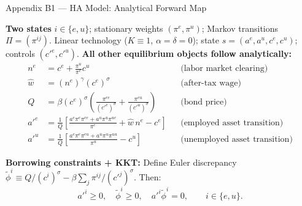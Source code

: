 \documentclass[10pt,aspectratio=169]{beamer}
\begin{document}
\begin{frame}[label=appHAmodel]{Appendix B1 --- HA Model: Analytical Forward Map}
\hfill\hyperlink{mainM2}{}
\vspace{0.2em}

\textbf{Two states} $i\in\{e,u\}$; stationary weights $(\pi^e,\pi^u)$; Markov transitions $\Pi=(\pi^{ij})$.
Linear technology ($K\equiv1$, $\alpha=\delta=0$); state $s=(a^e,a^u,c^e,c^u)$; controls $(c'^e,c'^u)$.
\textbf{All other equilibrium objects follow analytically:}
\begin{align*}
n^e &= c^e + \tfrac{\pi^u}{\pi^e}c^u & &\text{(labor market clearing)}\\
\hat w &= (n^e)^\gamma(c^e)^\sigma & &\text{(after-tax wage)}\\
Q &= \beta(c^e)^\sigma\!\left(\tfrac{\pi^{ee}}{(c'^e)^\sigma}+\tfrac{\pi^{eu}}{(c'^u)^\sigma}\right) & &\text{(bond price)}\\
a'^e &= \tfrac{1}{Q}\!\left[\tfrac{a^e\pi^e\pi^{ee}+a^u\pi^u\pi^{ue}}{\pi^e}+\hat w\,n^e-c^e\right] & &\text{(employed asset transition)}\\
a'^u &= \tfrac{1}{Q}\!\left[\tfrac{a^e\pi^e\pi^{eu}+a^u\pi^u\pi^{uu}}{\pi^u}-c^u\right] & &\text{(unemployed asset transition)}
\end{align*}

\textbf{Borrowing constraints + KKT:} Define Euler discrepancy
$\tilde\phi^i\equiv Q/(c^i)^\sigma - \beta\sum_j\pi^{ij}/(c'^j)^\sigma$. Then:
\begin{equation} \label{eq:kkt}
a'^i\ge0,\quad \tilde\phi^i\ge0,\quad a'^i\tilde\phi^i=0,\qquad i\in\{e,u\}.
\end{equation}
\end{frame}
\end{document}
